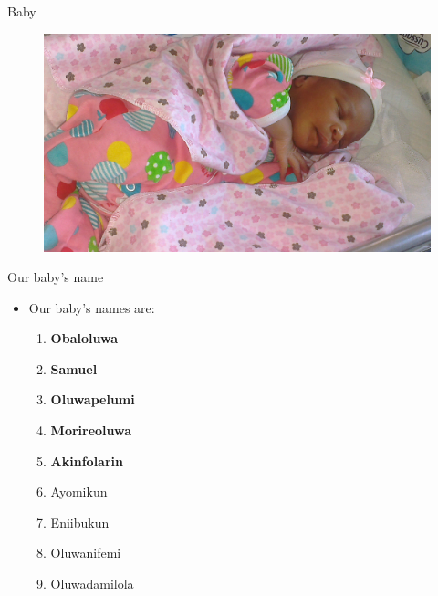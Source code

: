 \documentclass[11pt,pdf]{beamer}
\begin{document}
\begin{frame}{Baby}
\begin{figure}[t]
	\centering
	\includegraphics[width=1.03\linewidth]{Images/baby4.jpg}
\end{figure}
\end{frame}

\begin{frame}[t]{Our baby's name}
\begin{itemize}
	\item Our baby's names are:
	\begin{enumerate}
		\item \textbf{\textcolor{blue!45!black}{Obaloluwa}}
	\item
	\textbf{\textcolor{blue!45!black}{Samuel}} 
	\pause
	\item
	\textbf{\textcolor{blue!45!black}{Oluwapelumi}} 
	\pause
		\item
		 \textbf{\textcolor{blue!45!black}{Morireoluwa}} 
		\pause
		\item \textbf{\textcolor{blue!45!black}{Akinfolarin}} 
		\pause
		\item \textcolor{blue!45!black}{Ayomikun} 
		\pause
		\item \textcolor{blue!45!black}{Eniibukun} 
		\pause
		\item \textcolor{blue!45!black}{Oluwanifemi}
		\pause
		\item \textcolor{blue!45!black}{Oluwadamilola} 
		\pause
		
	\end{enumerate}
\end{itemize}

\end{frame}
\end{document}
